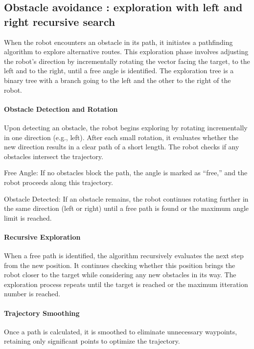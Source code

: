\subsection{Obstacle avoidance : exploration with left and right recursive search}

When the robot encounters an obstacle in its path, it initiates a pathfinding algorithm to explore alternative routes. This exploration phase involves adjusting the robot’s direction by incrementally rotating the vector facing the target, to the left and to the right, until a free angle is identified. The exploration tree is a binary tree with a branch going to the left and the other to the right of the robot.

\paragraph{Obstacle Detection and Rotation}

Upon detecting an obstacle, the robot begins exploring by rotating incrementally in one direction (e.g., left). After each small rotation, it evaluates whether the new direction results in a clear path of a short length. The robot checks if any obstacles intersect the trajectory.

Free Angle: If no obstacles block the path, the angle is marked as “free,” and the robot proceeds along this trajectory.

Obstacle Detected: If an obstacle remains, the robot continues rotating further in the same direction (left or right) until a free path is found or the maximum angle limit is reached.

\paragraph{Recursive Exploration}

When a free path is identified, the algorithm recursively evaluates the next step from the new position. It continues checking whether this position brings the robot closer to the target while considering any new obstacles in its way. The exploration process repeats until the target is reached or the maximum itteration number is reached.

\paragraph{Trajectory Smoothing}

Once a path is calculated, it is smoothed to eliminate unnecessary waypoints, retaining only significant points to optimize the trajectory.

